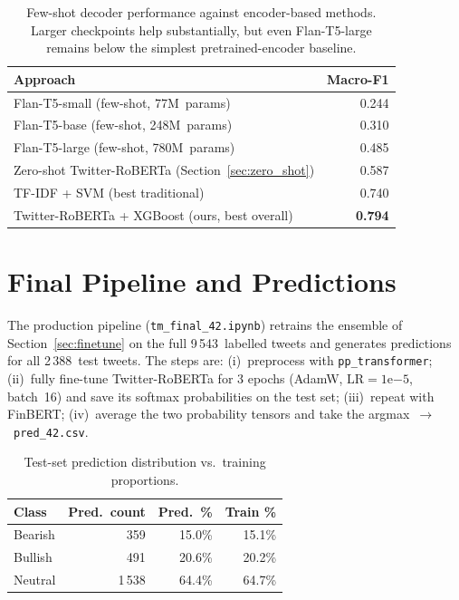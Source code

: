 \documentclass[12pt,a4paper]{article}
\begin{document}
\begin{table}[!htbp]
\centering
\begin{tabular}{lr}
\toprule
\textbf{Approach} & \textbf{Macro-F1} \\
\midrule
Flan-T5-small (few-shot, 77M~params)  & 0.244 \\
Flan-T5-base  (few-shot, 248M~params) & 0.310 \\
Flan-T5-large (few-shot, 780M~params) & 0.485 \\
\midrule
Zero-shot Twitter-RoBERTa (Section~\ref{sec:zero_shot}) & 0.587 \\
TF-IDF + SVM (best traditional)                         & 0.740 \\
Twitter-RoBERTa + XGBoost (ours, best overall)          & \textbf{0.794} \\
\bottomrule
\end{tabular}
\caption{Few-shot decoder performance against encoder-based methods. Larger checkpoints help substantially, but even Flan-T5-large remains below the simplest pretrained-encoder baseline.}
\label{tab:decoder}
\end{table}

\section{Final Pipeline and Predictions}
\label{sec:final}

The production pipeline (\texttt{tm\_final\_42.ipynb}) retrains the ensemble of Section~\ref{sec:finetune} on the full 9\,543~labelled tweets and generates predictions for all 2\,388~test tweets. The steps are: (i)~preprocess with \texttt{pp\_transformer}; (ii)~fully fine-tune Twitter-RoBERTa for 3 epochs (AdamW, $\mathrm{LR}{=}1\mathrm{e}{-5}$, batch~16) and save its softmax probabilities on the test set; (iii)~repeat with FinBERT; (iv)~average the two probability tensors and take the argmax~$\rightarrow$~\texttt{pred\_42.csv}.

\begin{table}[!htbp]
\centering
\begin{tabular}{lrrr}
\toprule
\textbf{Class} & \textbf{Pred.\ count} & \textbf{Pred.\ \%} & \textbf{Train \%} \\
\midrule
Bearish & 359   & 15.0\% & 15.1\% \\
Bullish & 491   & 20.6\% & 20.2\% \\
Neutral & 1\,538 & 64.4\% & 64.7\% \\
\bottomrule
\end{tabular}
\caption{Test-set prediction distribution vs.\ training proportions.}
\label{tab:final_pred}
\end{table}
\end{document}
